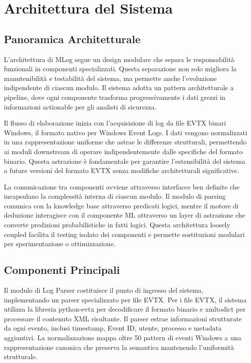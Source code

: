 \documentclass[12pt,a4paper]{report}
\theoremstyle{definition}
\begin{document}
\chapter{Architettura del Sistema}

\section{Panoramica Architetturale}

L'architettura di MLog segue un design modulare che separa le responsabilità funzionali in componenti specializzati. Questa separazione non solo migliora la manutenibilità e testabilità del sistema, ma permette anche l'evoluzione indipendente di ciascun modulo. Il sistema adotta un pattern architetturale a pipeline, dove ogni componente trasforma progressivamente i dati grezzi in informazioni actionable per gli analisti di sicurezza.

Il flusso di elaborazione inizia con l'acquisizione di log da file EVTX binari Windows, il formato nativo per Windows Event Logs. I dati vengono normalizzati in una rappresentazione uniforme che astrae le differenze strutturali, permettendo ai moduli downstream di operare indipendentemente dalle specifiche del formato binario. Questa astrazione è fondamentale per garantire l'estensibilità del sistema a future versioni del formato EVTX senza modifiche architetturali significative.

La comunicazione tra componenti avviene attraverso interfacce ben definite che incapsulano la complessità interna di ciascun modulo. Il modulo di parsing comunica con la knowledge base attraverso predicati logici, mentre il motore di deduzione interagisce con il componente ML attraverso un layer di astrazione che converte predizioni probabilistiche in fatti logici. Questa architettura loosely coupled facilita il testing isolato dei componenti e permette sostituzioni modulari per sperimentazione o ottimizzazione.

\section{Componenti Principali}

Il modulo di Log Parser costituisce il punto di ingresso del sistema, implementando un parser specializzato per file EVTX. Per i file EVTX, il sistema utilizza la libreria python-evtx per decodificare il formato binario e xmltodict per processare il contenuto XML risultante. Il parser estrae informazioni strutturate da ogni evento, inclusi timestamp, Event ID, utente, processo e metadata aggiuntivi. La normalizzazione mappa oltre 50 pattern di eventi Windows a una rappresentazione canonica che preserva la semantica mantenendo l'uniformità strutturale.
\end{document}
